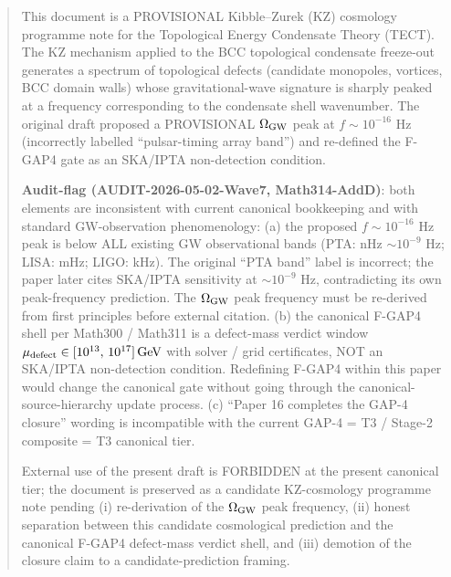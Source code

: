 \author{Jusang Lee}

\date{\today}

\begin{abstract}
This document is a PROVISIONAL Kibble--Zurek (KZ) cosmology programme
note for the Topological Energy Condensate Theory (TECT). The KZ
mechanism applied to the BCC topological condensate freeze-out
generates a spectrum of topological defects (candidate monopoles,
vortices, BCC domain walls) whose gravitational-wave signature is
sharply peaked at a frequency corresponding to the condensate shell
wavenumber. The original draft proposed a PROVISIONAL
$\Omega_{\rm GW}$ peak at $f \sim 10^{-16}$ Hz (incorrectly labelled
``pulsar-timing array band'') and re-defined the F-GAP4 gate as an
SKA/IPTA non-detection condition.

\textbf{Audit-flag (AUDIT-2026-05-02-Wave7, Math314-AddD)}: both
elements are inconsistent with current canonical bookkeeping and
with standard GW-observation phenomenology:
(a) the proposed $f \sim 10^{-16}$ Hz peak is below ALL existing GW
observational bands (PTA: nHz $\sim 10^{-9}$ Hz; LISA: mHz; LIGO:
kHz). The original ``PTA band'' label is incorrect; the paper later
cites SKA/IPTA sensitivity at $\sim 10^{-9}$ Hz, contradicting its
own peak-frequency prediction. The $\Omega_{\rm GW}$ peak frequency
must be re-derived from first principles before external citation.
(b) the canonical F-GAP4 shell per Math300 / Math311 is a
defect-mass verdict window
$\mu_{\rm defect} \in [10^{13},\,10^{17}]\,\mathrm{GeV}$ with
solver / grid certificates, NOT an SKA/IPTA non-detection condition.
Redefining F-GAP4 within this paper would change the canonical gate
without going through the canonical-source-hierarchy update process.
(c) ``Paper 16 completes the GAP-4 closure'' wording is incompatible
with the current GAP-4 = T3 / Stage-2 composite = T3 canonical tier.

External use of the present draft is FORBIDDEN at the present
canonical tier; the document is preserved as a candidate
KZ-cosmology programme note pending (i) re-derivation of the
$\Omega_{\rm GW}$ peak frequency, (ii) honest separation between this
candidate cosmological prediction and the canonical F-GAP4
defect-mass verdict shell, and (iii) demotion of the closure claim
to a candidate-prediction framing.
\end{abstract}

\maketitle

